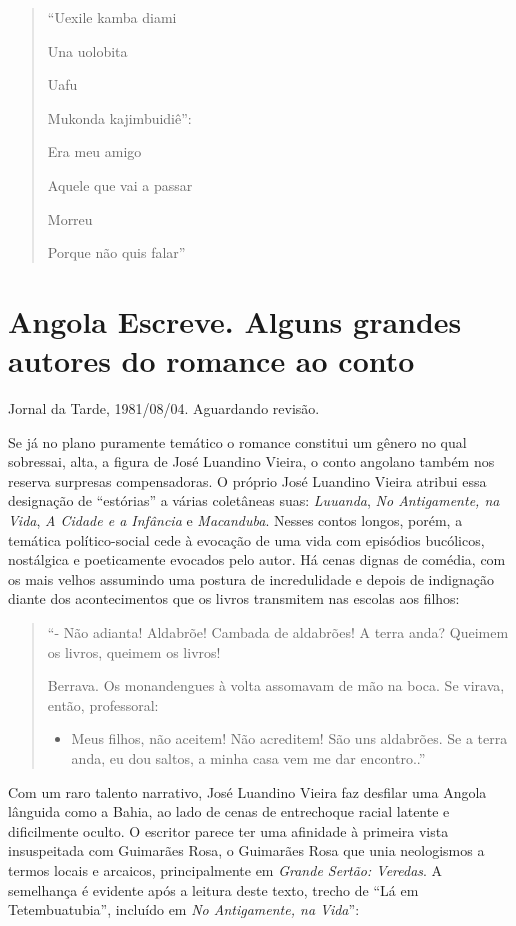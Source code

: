 \documentclass[
  letterpaper,
  DIV=11,
  numbers=noendperiod]{scrreprt}
\providecommand{\tightlist}{%
  \setlength{\itemsep}{0pt}\setlength{\parskip}{0pt}}\usepackage{longtable,booktabs,array}
\begin{document}
\begin{quote}
``Uexile kamba diami

Una uolobita

Uafu

Mukonda kajimbuidiê'':

Era meu amigo

Aquele que vai a passar

Morreu

Porque não quis falar''
\end{quote}

\chapter{Angola Escreve. Alguns grandes autores do romance ao
conto}\label{angola-escreve.-alguns-grandes-autores-do-romance-ao-conto}

Jornal da Tarde, 1981/08/04. Aguardando revisão.

\hfill\break

Se já no plano puramente temático o romance constitui um gênero no qual
sobressai, alta, a figura de José Luandino Vieira, o conto angolano
também nos reserva surpresas compensadoras. O próprio José Luandino
Vieira atribui essa designação de ``estórias'' a várias coletâneas suas:
\emph{Luuanda}, \emph{No Antigamente, na Vida}, \emph{A Cidade e a
Infância} e \emph{Macanduba}. Nesses contos longos, porém, a temática
político-social cede à evocação de uma vida com episódios bucólicos,
nostálgica e poeticamente evocados pelo autor. Há cenas dignas de
comédia, com os mais velhos assumindo uma postura de incredulidade e
depois de indignação diante dos acontecimentos que os livros transmitem
nas escolas aos filhos:

\begin{quote}
``- Não adianta! Aldabrõe! Cambada de aldabrões! A terra anda? Queimem
os livros, queimem os livros!~

Berrava. Os monandengues à volta assomavam de mão na boca. Se virava,
então, professoral:~

\begin{itemize}
\tightlist
\item
  Meus filhos, não aceitem! Não acreditem! São uns aldabrões. Se a terra
  anda, eu dou saltos, a minha casa vem me dar encontro..''
\end{itemize}
\end{quote}

Com um raro talento narrativo, José Luandino Vieira faz desfilar uma
Angola lânguida como a Bahia, ao lado de cenas de entrechoque racial
latente e dificilmente oculto. O escritor parece ter uma afinidade à
primeira vista insuspeitada com Guimarães Rosa, o Guimarães Rosa que
unia neologismos a termos locais e arcaicos, principalmente em
\emph{Grande Sertão: Veredas}. A semelhança é evidente após a leitura
deste texto, trecho de ``Lá em Tetembuatubia'', incluído em \emph{No
Antigamente, na Vida}'':
\end{document}
